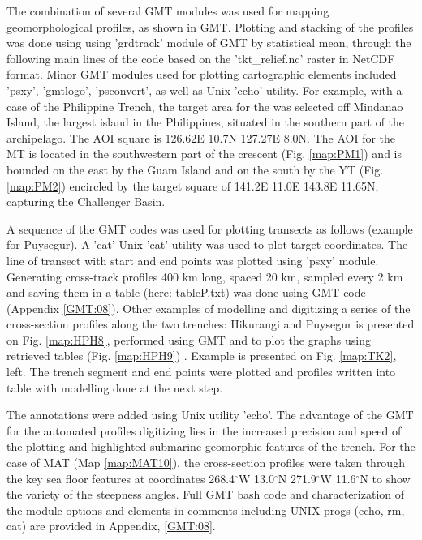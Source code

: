 \documentclass[11pt,a4paper]{report}
\begin{document}
{The combination of several GMT modules was used for mapping geomorphological profiles, as shown in GMT. Plotting and stacking of the profiles was done using using 'grdtrack' module of \ac{GMT} by statistical mean, through the following main lines of the code based on the 'tkt\_relief.nc' raster in \ac{NetCDF} format. Minor \ac{GMT} modules used for plotting cartographic elements included 'psxy', 'gmtlogo', 'psconvert', as well as Unix 'echo' utility. 
For example, with a case of the Philippine Trench, the target area for the  was selected off Mindanao Island, the  largest island in the Philippines, situated in the southern part of the archipelago. The \ac{AOI} square is 126.62\degree E 10.7\degree N 127.27\degree E 8.0\degree N. The \ac{AOI} for the \ac{MT} is located in the southwestern part of the crescent (Fig. \ref{map:PM1}) and is bounded on the east by the Guam Island and on the south by the \ac{YT} (Fig. \ref{map:PM2}) encircled by the target square of 141.2\degree E 11.0\degree E 143.8\degree E 11.65\degree N, capturing the Challenger Basin. 

A sequence of the GMT codes was used for plotting transects as follows (example for Puysegur). A 'cat' Unix 'cat' utility was used to plot target coordinates. The line of transect with start and end points was plotted using 'psxy' module. Generating cross-track profiles 400 km long, spaced 20 km, sampled every 2 km and saving them in a table (here: tableP.txt) was done using GMT code (Appendix \ref{GMT:08}). Other examples of modelling and digitizing a series of the cross-section profiles along the two trenches: Hikurangi and Puysegur is presented on Fig. \ref{map:HPH8}, performed using \ac{GMT} and to plot the graphs using retrieved tables (Fig. \ref{map:HPH9}) \cite{Lemenkova202031}. Example is presented on Fig. \ref{map:TK2}, left. The trench segment and end points were plotted and profiles written into table with modelling done at the next step. 

The annotations were added using Unix utility 'echo'. The advantage of the \ac{GMT} for the automated profiles digitizing lies in the increased precision and speed of the plotting and highlighted submarine geomorphic features of the trench. For the case of \ac{MAT} (Map \ref{map:MAT10}), the cross-section  profiles were taken through the key sea floor features at coordinates 268.4$^{\circ}$W 13.0$^{\circ}$N 271.9$^{\circ}$W 11.6$^{\circ}$N to show the variety of the steepness angles. Full \ac{GMT} \ac{bash} code and characterization of the module options and elements in comments including UNIX progs (echo, rm, cat) are provided in Appendix, \ref{GMT:08}.

}
\end{document}
